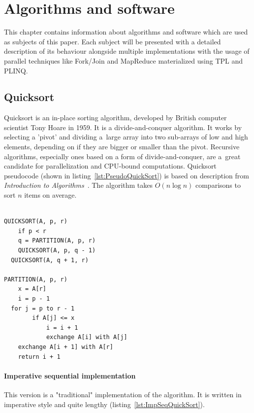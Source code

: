 \chapter{Algorithms and software}
\label{chap:4}
This chapter contains information about algorithms and software which are used as subjects of this paper. Each subject will be presented with a detailed description of its behaviour alongside multiple implementations with the usage of parallel techniques like Fork/Join and MapReduce materialized using TPL and PLINQ.

\section{Quicksort}
\label{sec: QuickSortImp}
Quicksort is an in-place sorting algorithm, developed by British computer scientist Tony Hoare in 1959. It is a divide-and-conquer algorithm. It works by selecting a 'pivot' and dividing a~large array into two sub-arrays of low and high elements, depending on if they are bigger or smaller than the pivot. Recursive algorithms, especially ones based on a form of divide-and-conquer, are a~great candidate for parallelization and CPU-bound computations. Quicksort pseudocode (shown in listing~\ref{lst:PseudoQuickSort}) is based on description from \emph{Introduction to Algorithms}~\cite{Cormen2009}. The algorithm takes $O(n \log n)$ comparisons to sort $n$ items on average.

\begin{lstlisting}[basicstyle=\ttfamily\small, caption={Sequential \texttt{quicksort} pseudocode}, label={lst:PseudoQuickSort}]

QUICKSORT(A, p, r)
	if p < r
	q = PARTITION(A, p, r)
	QUICKSORT(A, p, q - 1)
  QUICKSORT(A, q + 1, r)
	
PARTITION(A, p, r)
	x = A[r]
	i = p - 1
  for j = p to r - 1
		if A[j] <= x
			i = i + 1
			exchange A[i] with A[j]
	exchange A[i + 1] with A[r]
	return i + 1
\end{lstlisting}

\subsubsection{Imperative sequential implementation}
This version is a "traditional" implementation of the algorithm. It is written in imperative style and quite lengthy (listing~\ref{lst:ImpSeqQuickSort}).

